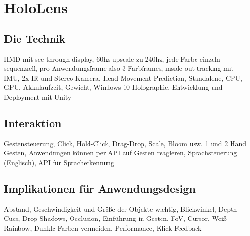 \section{HoloLens}
\label{sec-3}
	
\subsection{Die Technik}
\label{sec-3-1}
HMD mit see through display, 60hz upscale zu 240hz, jede Farbe einzeln sequenziell, pro Anwendungsframe also 3 Farbframes, inside out tracking mit IMU, 2x IR und Stereo Kamera, Head Movement Prediction, Standalone, CPU, GPU, Akkulaufzeit, Gewicht, Windows 10 Holographic, Entwicklung und Deployment mit Unity

\subsection{Interaktion}
\label{sec-3-2}
Gestensteuerung, Click, Hold-Click, Drag-Drop, Scale, Bloom usw. 1 und 2 Hand Gesten, Anwendungen können per API auf Gesten reagieren, Sprachsteuerung (Englisch), API für Spracherkennung

\subsection{Implikationen für Anwendungsdesign}
\label{sec-3-3}
Abstand, Geschwindigkeit und Größe der Objekte wichtig, Blickwinkel, Depth Cues, Drop Shadows, Occlusion, Einführung in Gesten, FoV, Cursor, Weiß - Rainbow, Dunkle Farben vermeiden, Performance, Klick-Feedback